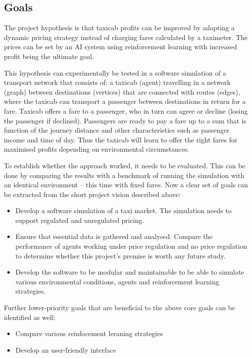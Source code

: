 \subsection{Goals}
\label{sec:intro:goals}

The project hypothesis is that taxicab profits can be improved by adapting a
dynamic pricing strategy instead of charging fares calculated by a taximeter.
The prices can be set by an AI system using reinforcement learning with
increased profit being the ultimate goal. 

This hypothesis can experimentally be tested in a software simulation of a
transport network that consists of: a taxicab (agent) travelling in a network
(graph) between destinations (vertices) that are connected with routes (edges),
where the taxicab can transport a passenger between destinations in return for
a fare. Taxicab offers a fare to a passenger, who in turn can agree or decline
(losing the passenger if declined). Passengers are ready to pay a fare up to a
sum that is function of the journey distance and other  characteristics such as
passenger income and time of day. Thus the taxicab will learn to offer the
right fares for maximised profits depending on environmental circumstances.

To establish whether the approach worked, it needs to be evaluated. This can be
done by comparing the results with a benchmark of running the simulation with an
identical environment -- this time with fixed fares.
Now a clear set of goals can be extracted from the short project vision
described above:

\begin{itemize}
  \item Develop a software simulation of a taxi market. The simulation needs to
        support regulated and unregulated pricing.
  \item Ensure that essential data is gathered and analysed. Compare the 
        performance of agents working under price regulation and no price 
        regulation to determine whether this project's premise is worth any
        future study.
  \item Develop the software to be modular and maintainable to be able to
        simulate various environmental conditions, agents and reinforcement
        learning strategies.
\end{itemize}

Further lower-priority goals that are beneficial to the above core goals can be
identified as well:

\begin{itemize}
  \item Compare various reinfocement leraning strategies
  \item Develop an user-friendly interface
\end{itemize}

